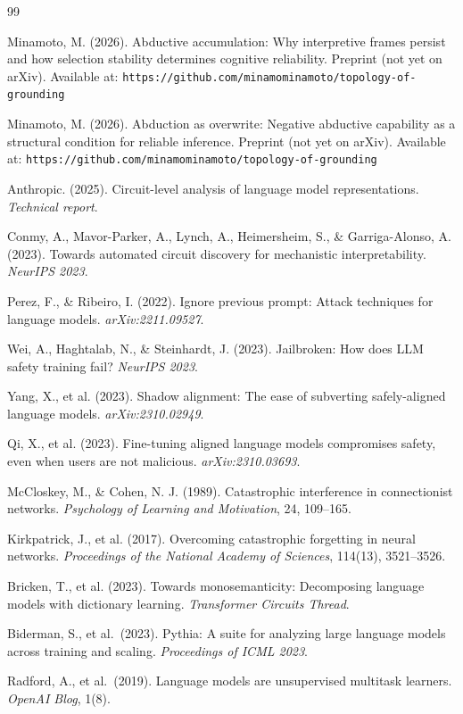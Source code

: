 \documentclass[12pt]{article}
\begin{document}
\begin{thebibliography}{99}

Minamoto, M. (2026). Abductive accumulation: Why interpretive frames
persist and how selection stability determines cognitive reliability.
Preprint (not yet on arXiv). Available at:
\texttt{https://github.com/minamominamoto/topology-of-grounding}

Minamoto, M. (2026). Abduction as overwrite: Negative abductive
capability as a structural condition for reliable inference.
Preprint (not yet on arXiv). Available at:
\texttt{https://github.com/minamominamoto/topology-of-grounding}

Anthropic. (2025). Circuit-level analysis of language model
representations. \textit{Technical report}.

Conmy, A., Mavor-Parker, A., Lynch, A., Heimersheim, S.,
\& Garriga-Alonso, A. (2023). Towards automated circuit discovery
for mechanistic interpretability. \textit{NeurIPS 2023}.

Perez, F., \& Ribeiro, I. (2022). Ignore previous prompt:
Attack techniques for language models. \textit{arXiv:2211.09527}.

Wei, A., Haghtalab, N., \& Steinhardt, J. (2023). Jailbroken:
How does LLM safety training fail? \textit{NeurIPS 2023}.

Yang, X., et al. (2023). Shadow alignment: The ease of subverting
safely-aligned language models. \textit{arXiv:2310.02949}.

Qi, X., et al. (2023). Fine-tuning aligned language models
compromises safety, even when users are not malicious.
\textit{arXiv:2310.03693}.

McCloskey, M., \& Cohen, N. J. (1989). Catastrophic interference
in connectionist networks. \textit{Psychology of Learning and
Motivation}, 24, 109--165.

Kirkpatrick, J., et al. (2017). Overcoming catastrophic forgetting
in neural networks. \textit{Proceedings of the National Academy
of Sciences}, 114(13), 3521--3526.

Bricken, T., et al. (2023). Towards monosemanticity: Decomposing
language models with dictionary learning.
\textit{Transformer Circuits Thread}.

Biderman, S., et al.\ (2023).
Pythia: A suite for analyzing large language models across training and scaling.
\textit{Proceedings of ICML 2023}.

Radford, A., et al.\ (2019).
Language models are unsupervised multitask learners.
\textit{OpenAI Blog}, 1(8).

\end{thebibliography}
\end{document}
